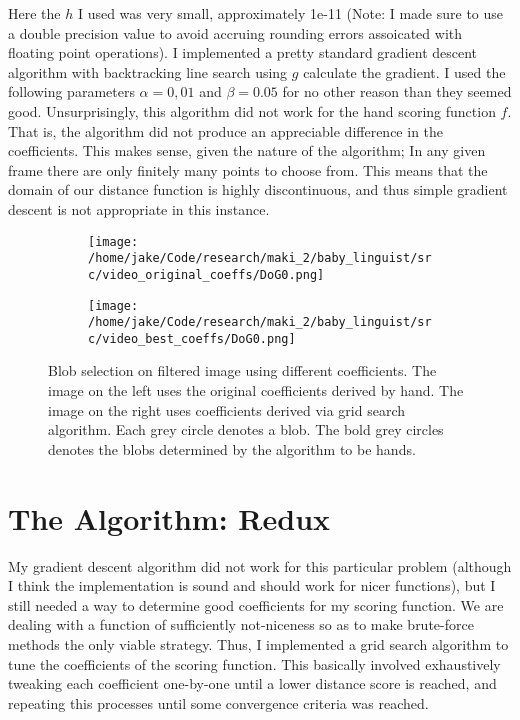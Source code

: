 \documentclass[11pt]{article}
\begin{document}
Here the \(h\)  I used was very small, approximately 1e-11 (Note: I made sure to use a double precision value to avoid accruing rounding errors assoicated with floating point operations). I implemented a pretty standard gradient descent algorithm with backtracking line search using \(g\) calculate the gradient. I used the following parameters \(\alpha = 0,01\) and \(\beta = 0.05\) for no other reason than they seemed good. Unsurprisingly, this algorithm did not work for the hand scoring function \(f\). That is, the algorithm did not produce an appreciable difference in the coefficients. This makes sense, given the nature of the algorithm; In any given frame there are only finitely many points to choose from. This means that the domain of our distance function is highly discontinuous, and thus simple gradient descent is not appropriate in this instance. 



\begin{figure}
\centering
\begin{subfigure}{\textwidth}
  \centering
  \texttt{[image: /home/jake/Code/research/maki\_2/baby\_linguist/src/video\_original\_coeffs/DoG0.png]}
  \label{fig:sub1}
\end{subfigure}%
\begin{subfigure}{\textwidth}
  \centering
  \texttt{[image: /home/jake/Code/research/maki\_2/baby\_linguist/src/video\_best\_coeffs/DoG0.png]}
  \label{fig:sub2}
\end{subfigure}
\caption{Blob selection on filtered image using different coefficients. The image on the left uses the original coefficients derived by hand. The image on the right uses coefficients derived via grid search algorithm. Each grey circle denotes a blob. The bold grey circles denotes the blobs determined by the algorithm to be hands.}
\label{fig:test}
\end{figure}

\section{The Algorithm: Redux}
\label{sec:org436d432}

My gradient descent algorithm did not work for this particular problem (although I think the implementation is sound and should work for nicer functions), but I still needed a way to determine good coefficients for my scoring function. We are dealing with a function of sufficiently not-niceness so as to make brute-force methods the only viable strategy. Thus, I implemented a grid search algorithm to tune the coefficients of the scoring function. This basically involved exhaustively tweaking each coefficient one-by-one until a lower distance score is reached, and repeating this processes until some convergence criteria was reached.
\end{document}
